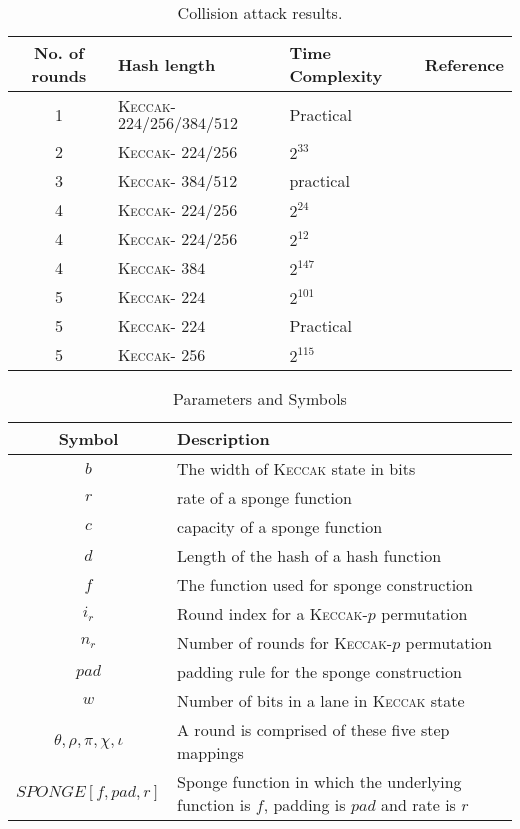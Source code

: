 \documentclass[runningheads]{llncs}
\newcommand{\KECCAK}{\mbox{\textsc{Keccak}}}
\newcommand{\Keccak}{\mbox{\textsc{Keccak}}}
\begin{document}
\begin{table}
\begin{center}
\caption{Collision attack results.}\label{tab2}
\begin{tabular}{|c|l|l|c|}
\hline
No. of rounds & Hash length & Time Complexity & Reference\\
\hline
1 & \Keccak - $224/256/384/512$ & Practical & ~\cite{kumar2018cryptanalysis} \\
2 & \Keccak - $224/256$ & $2^{33}$ & ~\cite{naya2011practical}\\
3 & \Keccak - $384/512$ & practical & ~\cite{dinur2013collision}\\
4 & \Keccak - $224/256$ & $2^{24}$ & ~\cite{dinur2012new}\\
4 & \Keccak - $224/256$ & $2^{12}$ & ~\cite{qiao2017new}\\
4 & \Keccak - $384$ & $2^{147}$ & ~\cite{dinur2013collision}\\
5 & \Keccak - $224$ & $2^{101}$ & ~\cite{qiao2017new}\\
5 & \Keccak - $224$ & Practical & ~\cite{song2017non}\\
5 & \Keccak - $256$ & $2^{115}$ & ~\cite{dinur2013collision}\\
\hline
\end{tabular}
\end{center}
\end{table}

\begin{table}
\begin{center}
\caption{Parameters and Symbols}\label{tab3}
\begin{tabular}{|c|l|}
\hline
Symbol & Description\\
\hline
$b$ & The width of \KECCAK{} state in bits \\
$r$ & rate of a sponge function \\
$c$ & capacity of a sponge function\\
$d$ & Length of the hash of a hash function\\
$f$ & The function used for sponge construction \\
$i_r$ & Round index for a \KECCAK-$p$ permutation\\
$n_r$ & Number of rounds for \KECCAK-$p$ permutation\\
$pad$ & padding rule for the sponge construction\\
$w$ & Number of bits in a lane in \KECCAK{} state\\
$\theta,\rho,\pi,\chi,\iota$ & A round is comprised of these five step mappings \\
$SPONGE[f, pad, r]$ & Sponge function in which the underlying function is $f$, padding is $pad$ and rate is $r$ \\
\hline
\end{tabular}
\end{center}
\end{table}
\end{document}
